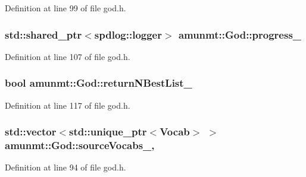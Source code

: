 Definition at line 99 of file god.\+h.

\subsubsection[{\texorpdfstring{progress\+\_\+}{progress_}}]{\setlength{\rightskip}{0pt plus 5cm}std\+::shared\+\_\+ptr$<$spdlog\+::logger$>$ amunmt\+::\+God\+::progress\+\_\+\hspace{0.3cm}{\ttfamily [private]}}\hypertarget{classamunmt_1_1God_a873205411a78432714ad191989c78367}{}\label{classamunmt_1_1God_a873205411a78432714ad191989c78367}


Definition at line 107 of file god.\+h.

\subsubsection[{\texorpdfstring{return\+N\+Best\+List\+\_\+}{returnNBestList_}}]{\setlength{\rightskip}{0pt plus 5cm}bool amunmt\+::\+God\+::return\+N\+Best\+List\+\_\+\hspace{0.3cm}{\ttfamily [private]}}\hypertarget{classamunmt_1_1God_a83284d424437eb00ebe5fcd5666cebfb}{}\label{classamunmt_1_1God_a83284d424437eb00ebe5fcd5666cebfb}


Definition at line 117 of file god.\+h.

\subsubsection[{\texorpdfstring{source\+Vocabs\+\_\+}{sourceVocabs_}}]{\setlength{\rightskip}{0pt plus 5cm}std\+::vector$<$std\+::unique\+\_\+ptr$<${\bf Vocab}$>$ $>$ amunmt\+::\+God\+::source\+Vocabs\+\_\+\hspace{0.3cm}{\ttfamily [mutable]}, {\ttfamily [private]}}\hypertarget{classamunmt_1_1God_acb283c7cf822e3efed96a938695c1ac0}{}\label{classamunmt_1_1God_acb283c7cf822e3efed96a938695c1ac0}


Definition at line 94 of file god.\+h.

